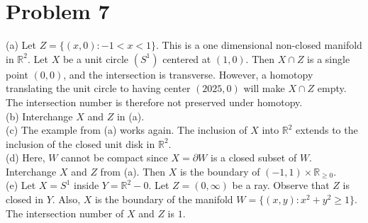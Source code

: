 \documentclass{amsart}
\numberwithin{equation}{section}
\theoremstyle{plain}
\theoremstyle{definition}
\theoremstyle{remark}
\renewcommand{\_}[2]{\underbrace{#1}_{#2}}
\renewcommand{\^}[2]{\overbrace{#1}_{#2}}
\newcommand{\R}{\mathbb{R}}
\begin{document}
\section*{Problem 7}
(a) Let $Z = \{(x,0): -1<x<1\}$. This is a one dimensional non-closed manifold in $\R^2$. Let $X$ be a unit circle $(S^1)$ centered at $(1,0)$. Then $X \cap Z$ is a single point $(0,0)$, and the intersection is transverse. However, a homotopy translating the unit circle to having center $(2025, 0)$ will make $X \cap Z$ empty. The intersection number is therefore not preserved under homotopy.\\

(b) Interchange $X$ and $Z$ in (a). \\

(c) The example from (a) works again. The inclusion of $X$ into $\R^2$ extends to the inclusion of the closed unit disk in $\R^2$. \\

(d) Here, $W$ cannot be compact since $X = \partial W$ is a closed subset of $W$. Interchange $X$ and $Z$ from (a). Then $X$ is the boundary of $(-1,1)\times \R_{\geq 0}$. \\

(e) Let $X = S^1$ inside $Y = \R^2 - 0$. Let $Z = (0,\infty)$ be a ray. Observe that $Z$ is closed in $Y$. Also, $X$ is the boundary of the manifold $W = \{(x,y): x^2 + y^2 \geq 1\}$. The intersection number of $X$ and $Z$ is $1$. 
\end{document}
